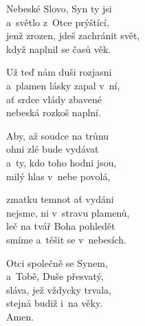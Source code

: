 \begin{translatioMulticol}{5}
Nebeské Slovo, Syn ty jsi\\
a~světlo z~Otce prýštící,\\
jenž zrozen, jdeš zachránit svět,\\
když naplnil se časů věk.\columnbreak

Už teď nám duši rozjasni\\
a~plamen lásky zapal v~ní,\\
ať srdce vlády zbavené\\
nebeská rozkoš naplní.\columnbreak

Aby, až soudce na trůnu\\
ohni zlé bude vydávat\\
a~ty, kdo toho hodni jsou,\\
milý hlas v~nebe povolá,\columnbreak

zmatku temnot ať vydáni\\
nejsme, ni v~stravu plamenů,\\
leč na tvář Boha pohledět\\
smíme a~těšit se v~nebesích.\columnbreak

Otci společně se Synem,\\
a~Tobě, Duše přesvatý,\\
sláva, jež vždycky trvala,\\
stejná budiž i~na věky.\\
Amen.
\end{translatioMulticol}

